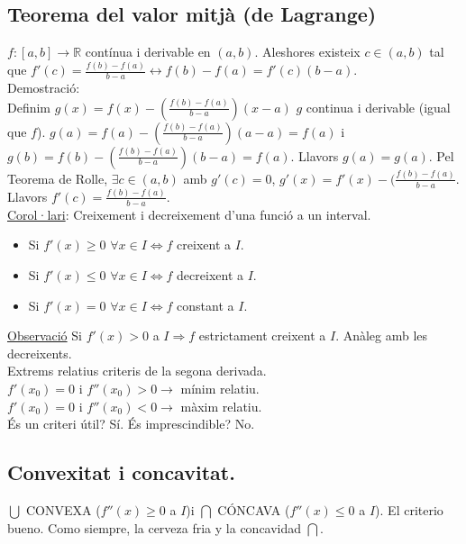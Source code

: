 \subsection{Teorema del valor mitjà (de Lagrange)}
$f: [a, b] \rightarrow \mathbb{R}$ contínua i derivable en $(a, b)$. Aleshores existeix $c \in (a, b)$ tal que $f'(c) = \frac{f(b) - f(a)}{b-a} \leftrightarrow f(b) - f(a) = f'(c)(b-a)$.\\
Demostració:\\
Definim $g(x) = f(x) - (\frac{f(b)-f(a)}{b-a})(x-a)$ $g$ continua i derivable (igual que $f$). $g(a) = f(a) - (\frac{f(b)-f(a)}{b-a})(a-a) = f(a)$ i $g(b) = f(b) - (\frac{f(b)-f(a)}{b-a})(b-a) = f(a)$. Llavors $g(a) = g(a)$. Pel Teorema de Rolle, $\exists c \in (a,b)$ amb $g'(c) = 0$, $g'(x) = f'(x) - (\frac{f(b)-f(a)}{b-a}$. Llavors $f'(c) = \frac{f(b)-f(a)}{b-a}$.\\
\underline{Corol·lari}: Creixement i decreixement d'una funció a un interval.
\begin{itemize}
    \item Si $f'(x) \geq 0$ $\forall x \in I \Longleftrightarrow f$ creixent a $I$.
    \item Si $f'(x) \leq 0$ $\forall x \in I \Longleftrightarrow f$ decreixent a $I$.
    \item Si $f'(x) = 0$ $\forall x \in I \Longleftrightarrow f$ constant a $I$.
\end{itemize}
\underline{Observació} Si $f'(x) > 0$ a $I \Rightarrow f$ estrictament creixent a $I$. Anàleg amb les decreixents.\\
Extrems relatius criteris de la segona derivada.\\
$f'(x_0) = 0$ i $f''(x_0) > 0 \rightarrow$ mínim relatiu.\\
$f'(x_0) = 0$ i $f''(x_0) < 0 \rightarrow$ màxim relatiu.\\
És un criteri útil? Sí. És imprescindible? No.\\
\subsection{Convexitat i concavitat.}
$\bigcup$ CONVEXA ($f''(x) \geq 0$ a $I$)i $\bigcap$ CÓNCAVA ($f''(x) \leq 0$ a $I$). El criterio bueno. Como siempre, la cerveza fria y la concavidad $\bigcap$.
